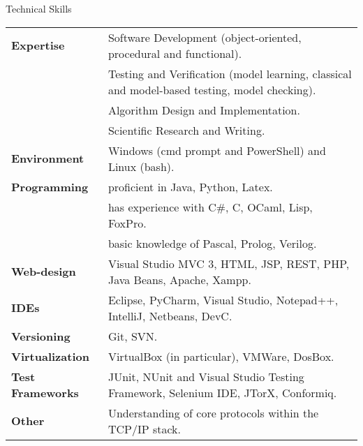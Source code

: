 \documentclass{resume} %
\begin{document}




\begin{rSection}{Technical Skills}
\begin{tabular}{@{} >{\bfseries}l @{\hspace{2ex}} >{\small}l}
\small{Expertise} 
& Software Development  {\footnotesize(object-oriented, procedural and functional)}. \\[0.2em]
& Testing and Verification {\footnotesize (model learning, classical and model-based testing, model checking)}. \\[0.2em]
& Algorithm Design and Implementation. \\[0.2em]
& Scientific Research and Writing. \\[0.7em]
\small{Environment} & Windows (cmd prompt and PowerShell) and Linux (bash). \\[0.7em] 
\small{Programming} & proficient in Java, Python, Latex. \\[0.2em]
& has experience with C\#, C, OCaml, Lisp, FoxPro.\\[0.2em]
& basic knowledge of Pascal, Prolog, Verilog.\\[0.7em]
\small{Web-design} & Visual Studio MVC 3, HTML, JSP, REST, PHP, Java Beans, Apache, Xampp. \\[0.7em]
\small{IDEs} & Eclipse, PyCharm, Visual Studio, Notepad++, IntelliJ, Netbeans, DevC. \\[0.7em]
\small{Versioning} & Git, SVN. \\[0.7em]
\small{Virtualization} & VirtualBox (in particular), VMWare, DosBox. \\[0.7em]
\small{Test Frameworks} & JUnit, NUnit and Visual Studio Testing Framework, Selenium IDE, JTorX, Conformiq. \\[0.7em]
\small{Other} & Understanding of core protocols within the TCP/IP stack. 
\end{tabular}
\end{rSection}
\end{document}
